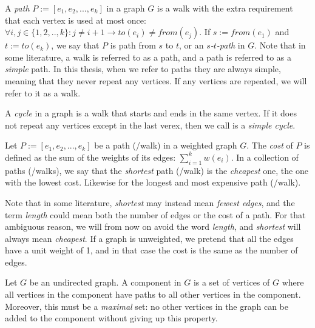 \begin{definition}[Path]
    A \emph{path} $P := [e_1, e_2, ..., e_k]$ in a graph $G$ is a walk with the extra requirement that each vertex is used at most once: $\forall i, j \in \{1,2,..,k\} : j \neq {i+1} \rightarrow to(e_i) \neq from(e_j)$.
    If $s := from(e_1)$ and $t := to(e_k)$, we say that $P$ is path from $s$ to $t$, or an \emph{$s$-$t$-path} in $G$.
    Note that in some literature, a walk is referred to as a path, and a path is referred to as a \emph{simple} path. In this thesis, when we refer to paths they are always simple, meaning that they never repeat any vertices. If any vertices are repeated, we will refer to it as a walk.    
\end{definition}

\begin{definition}[Cycle]
    A \emph{cycle} in a graph is a walk that starts and ends in the same vertex. If it does not repeat any vertices except in the last verex, then we call is a \emph{simple cycle}.
\end{definition}

\begin{definition}
    Let $P := [e_1, e_2, ..., e_k]$ be a path (/walk) in a weighted graph $G$. The \emph{cost} of $P$ is defined as the sum of the weights of its edges: $\sum_{i=1}^k w(e_i)$. In a collection of paths (/walks), we say that the \emph{shortest} path (/walk) is the \emph{cheapest} one, the one with the lowest cost. Likewise for the longest and most expensive path (/walk). 
\end{definition}

Note that in some literature, \emph{shortest} may instead mean \emph{fewest edges}, and the term \emph{length} could mean both the number of edges or the cost of a path. For that ambiguous reason, we will from now on avoid the word \emph{length}, and \emph{shortest} will always mean \emph{cheapest}. If a graph is unweighted, we pretend that all the edges have a unit weight of 1, and in that case the cost is the same as the number of edges.

\begin{definition}
    Let $G$ be an undirected graph. A component in $G$ is a set of vertices of $G$ where all vertices in the component have paths to all other vertices in the component. Moreover, this must be a \emph{maximal} set: no other vertices in the graph can be added to the component without giving up this property.
\end{definition}

